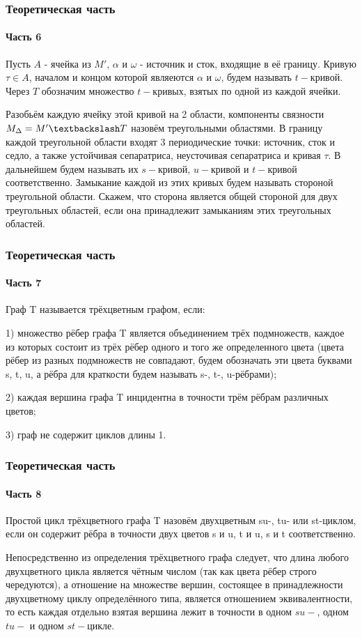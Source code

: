 \documentclass[aspectratio=169]{beamer}
\begin{document}
\begin{frame}
	\frametitle{Теоретическая часть}
	\framesubtitle{Часть 6}
	Пусть $A$ - ячейка из $M'$, $\alpha$ и $\omega$ - источник и сток, входящие в её границу. Кривую $\tau\in A$, началом и концом которой являеются $\alpha$ и $\omega$, будем называть $t-$кривой. Через $T$ обозначим множество $t-$кривых, взятых по одной из каждой ячейки.
	\par Разобьём каждую ячейку этой кривой на 2 области, компоненты связности $M_\Delta = M' \textbackslash T$ назовём треугольными областями. В границу каждой треугольной области входят 3 периодические точки: источник, сток и седло, а также устойчивая сепаратриса, неусточивая сепаратриса и кривая $\tau$. В дальнейшем будем называть их $s-$кривой, $u-$кривой и $t-$кривой соответственно. Замыкание каждой из этих кривых будем называть стороной треугольной области. Скажем, что сторона является общей стороной для двух треугольных областей, если она принадлежит замыканиям этих треугольных областей.
\end{frame}
\begin{frame}
\frametitle{Теоретическая часть}
\framesubtitle{Часть 7}
	\begin{definition} Граф T называется трёхцветным графом, если:
		\par 1) множество рёбер графа T является объединением трёх подмножеств, каждое из которых состоит из трёх рёбер одного и того же определенного цвета (цвета рёбер из разных подмножеств не совпадают, будем обозначать эти цвета буквами s, t, u, а рёбра для краткости будем называть s-, t-, u-рёбрами);
		\par 2) каждая вершина графа T инцидентна в точности трём рёбрам различных цветов;
		\par 3) граф не содержит циклов длины 1.
	\end{definition}
\end{frame}

\begin{frame}
	\frametitle{Теоретическая часть}
	\framesubtitle{Часть 8}
	\begin{definition}
		Простой цикл трёхцветного графа T назовём двухцветным su-, tu- или st-циклом, если он содержит рёбра в точности двух цветов s и u, t и u, s и t соответственно.
	\end{definition}
	Непосредственно из определения трёхцветного графа следует, что длина любого двухцветного цикла является чётным числом (так как цвета рёбер строго чередуются), а отношение на множестве вершин, состоящее в принадлежности двухцветному циклу определённого типа, является отношением эквивалентности, то есть каждая отдельно взятая вершина лежит в точности в одном  $su-$, одном $tu-$ и одном $st-$цикле.
\end{frame}
\end{document}
